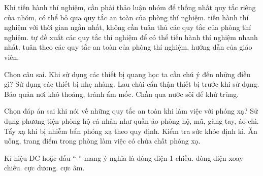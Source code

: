 
\begin{ex}
Khi tiến hành thí nghiệm, cần phải
\choice
{thảo luận nhóm để thống nhất quy tắc riêng của nhóm, có thể bỏ qua quy tắc an toàn của phòng thí nghiệm.}
{tiến hành thí nghiệm với thời gian ngắn nhất, không cần tuân thủ các quy tắc của phòng thí nghiệm.}
{tự đề xuất các quy tắc thí nghiệm để có thể tiến hành thí nghiệm nhanh nhất.}
{\True tuân theo các quy tắc an toàn của phòng thí nghiệm, hướng dẫn của giáo viên.}
\end{ex}

\begin{ex}
Chọn câu sai. Khi sử dụng các thiết bị quang học ta cần chú ý đến những điều gì?
\choice
{Sử dụng các thiết bị nhẹ nhàng.}
{Lau chùi cẩn thận thiết bị trước khi sử dụng.}
{Bảo quản nơi khô thoáng, tránh ẩm mốc.}
{\True Chần qua nước sôi để khử trùng.}
\end{ex}

\begin{ex}
Chọn đáp án sai khi nói về những quy tắc an toàn khi làm việc với phóng xạ?
\choice
{Sử dụng phương tiện phòng hộ cá nhân như quần áo phòng hộ, mũ, găng tay, áo chì.}
{Tẩy xạ khi bị nhiễm bẩn phóng xạ theo quy định.}
{Kiểm tra sức khỏe định kì.}
{\True Ăn uống, trang điểm trong phòng làm việc có chứa chất phóng xạ.}
\end{ex}

\begin{ex}
Kí hiệu DC hoặc dấu “-” mang ý nghĩa là
\choice
{\True dòng điện 1 chiều.}
{dòng điện xoay chiều.}
{cực dương.}
{cực âm.}
\end{ex}

